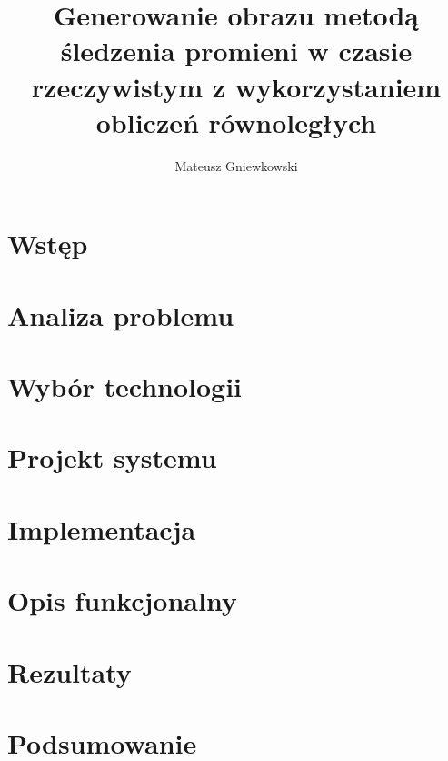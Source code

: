 \documentclass[eng,pl,printmode,openany]{mgr}
\title{Generowanie obrazu metodą śledzenia promieni w czasie rzeczywistym z wykorzystaniem obliczeń równoległych}
\author{Mateusz Gniewkowski}
\begin{document}
\maketitle


\tableofcontents

%

\chapter{Wstęp}


\chapter{Analiza problemu}


\chapter{Wybór technologii}


\chapter{Projekt systemu}


\chapter{Implementacja}


\chapter{Opis funkcjonalny}


\chapter{Rezultaty}


\chapter{Podsumowanie}
\end{document}
